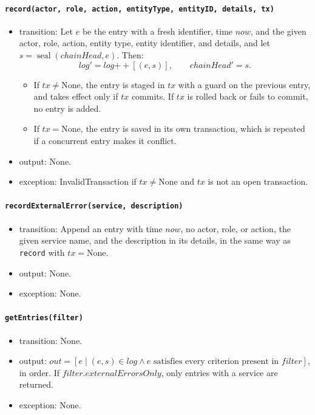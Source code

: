 \documentclass[12pt, titlepage]{article}
\begin{document}
\paragraph{\texttt{record(actor, role, action, entityType, entityID, details, tx)}}
\begin{itemize}
    \item transition: Let $e$ be the entry with a fresh identifier, time $\mathit{now}$, and the given actor, role,
    action, entity type, entity identifier, and details, and let $s=\operatorname{seal}(\mathit{chainHead},e)$. Then:
    \[
        \mathit{log}'=\mathit{log}\mathbin{+\!\!+}[(e,s)],\qquad\mathit{chainHead}'=s.
    \]
    \begin{itemize}
        \item If $tx\ne\text{None}$, the entry is staged in $tx$ with a guard on the previous entry, and takes effect
        only if $tx$ commits. If $tx$ is rolled back or fails to commit, no entry is added.
        \item If $tx=\text{None}$, the entry is saved in its own transaction, which is repeated if a concurrent entry makes it conflict.
    \end{itemize}
    \item output: None.
    \item exception: InvalidTransaction if $tx\ne\text{None}$ and $tx$ is not an open transaction.
\end{itemize}

\paragraph{\texttt{recordExternalError(service, description)}}
\begin{itemize}
    \item transition: Append an entry with time $\mathit{now}$, no actor, role, or action, the given service name, and
    the description in its details, in the same way as \texttt{record} with $tx=\text{None}$.
    \item output: None.
    \item exception: None.
\end{itemize}

\paragraph{\texttt{getEntries(filter)}}
\begin{itemize}
    \item transition: None.
    \item output: $out=[e\mid(e,s)\in\mathit{log}\land e\text{ satisfies every criterion present in }filter]$, in order.
    If $filter.externalErrorsOnly$, only entries with a service are returned.
    \item exception: None.
\end{itemize}
\end{document}
